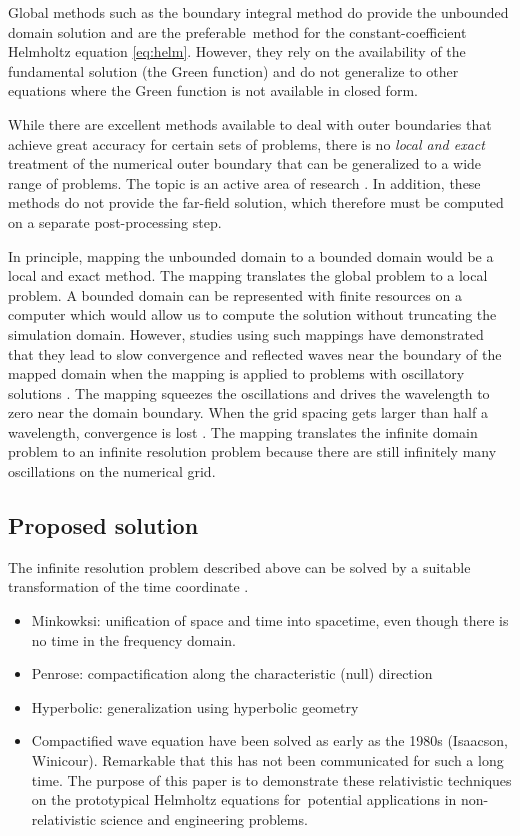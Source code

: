 \documentclass[draft,onefignum,onetabnum]{siamart190516}
\begin{document}
Global methods such as the boundary integral method do provide the unbounded domain solution and  are the preferable method for the constant-coefficient Helmholtz equation \eqref{eq:helm}. However, they rely on the availability of the fundamental solution (the Green function) and do not generalize to other equations where the Green function is not available in closed form.

While there are excellent methods available to deal with outer boundaries that achieve great accuracy for certain sets of problems, there is no {\it local and exact} treatment of the numerical outer boundary that can be generalized to a wide range of problems. The topic is an active area of research \cite{9196168, kirby2020finite, papadimitropoulos2020double, petropavlovsky2020numerical, duhamel2020computation}. In addition, these methods do not provide the far-field solution, which therefore must be computed on a separate post-processing step. 

In principle, mapping the unbounded domain to a bounded domain would be a local and exact method. The mapping translates the global problem to a local problem. A bounded domain can be represented with finite resources on a computer which would allow us to compute the solution without truncating the simulation domain. However, studies using such mappings have demonstrated that they lead to slow convergence and reflected waves near the boundary of the mapped domain when the mapping is applied to problems with oscillatory solutions \cite{GroschOrszag77, boyd1982optimization, shen2009some, shen2014approximations}. The mapping squeezes the oscillations and drives the wavelength to zero near the domain boundary. When the grid spacing gets larger than half a wavelength, convergence is lost \cite{GroschOrszag77}. The mapping translates the infinite domain problem to an infinite resolution problem because there are still infinitely many oscillations on the numerical grid.

\subsection{Proposed solution}
The infinite resolution problem described above can be solved by a suitable transformation of the time coordinate \cite{ZENGINOGLU20112286}.

\begin{itemize}
\item Minkowksi: unification of space and time into spacetime, even though there is no time in the frequency domain.
\item Penrose: compactification along the characteristic (null) direction
\item Hyperbolic: generalization using hyperbolic geometry 
\item Compactified wave equation have been solved as early as the 1980s (Isaacson, Winicour). Remarkable that this has not been communicated for such a long time. The purpose of this paper is to demonstrate these relativistic techniques on the prototypical Helmholtz equations for potential applications in non-relativistic science and engineering problems.
\end{itemize}
\end{document}
